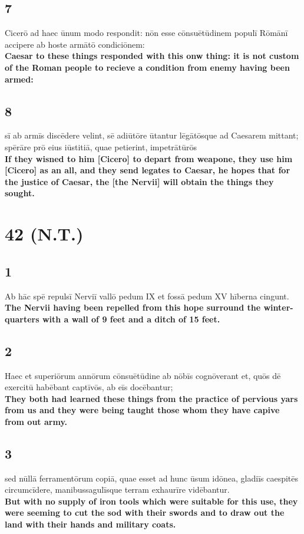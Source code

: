 \documentclass{article}
\begin{document}
\subsection*{7}
Cicerō ad haec ūnum modo respondit: nōn esse cōnsuētūdinem populī Rōmānī accipere ab hoste armātō condiciōnem:\\
\textbf{Caesar to these things responded with this onw thing: it is not custom of the Roman people to recieve a condition from enemy having been armed:}

\subsection*{8}
sī ab armīs discēdere velint, sē adiūtōre ūtantur lēgātōsque ad Caesarem mittant; spērāre prō eius iūstitiā, quae petierint, impetrātūrōs\\
\textbf{If they wisned to him [Cicero] to depart from weapone, they use him [Cicero] as an all, and they send legates to Caesar, he hopes that for the justice of Caesar, the [the Nervii] will obtain the things they sought.}


\section*{42 (N.T.) }

\subsection*{1}
Ab hāc spē repulsī Nerviī vallō pedum IX et fossā pedum XV hīberna cingunt.  \\
\textbf{The Nervii having been repelled from this hope surround the winter-quarters with a wall of 9 feet and a ditch of 15 feet.}

\subsection*{2}
Haec et superiōrum annōrum cōnsuētūdine ab nōbīs cognōverant et, quōs dē exercitū habēbant captīvōs, ab eīs docēbantur;  \\
\textbf{They both had learned these things from the practice of pervious yars from us and they were being taught those whom they have capive from out army.}

\subsection*{3}
sed nūllā ferramentōrum copiā, quae esset ad hunc ūsum idōnea, gladiīs caespitēs circumcīdere, manibussagulīsque terram exhaurīre vidēbantur.  \\
\textbf{But with no supply of iron tools which were suitable for this use, they were seeming to cut the sod with their swords and to draw out the land with their hands and military coats.}
\end{document}
